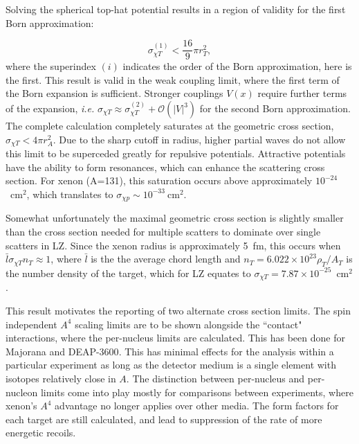 Solving the spherical top-hat potential results in a region of validity for the first Born approximation\cite{digman_not_2019}:

\begin{equation}
    \sigma_{\chi T}^{(1)} < \frac{16}{9} \pi r_T^2,
\end{equation}
\noindent
where the superindex $(i)$ indicates the order of the Born approximation, here is the first.
This result is valid in the weak coupling limit, where the first term of the Born expansion is sufficient.
Stronger couplings $V(x)$ require further terms of the expansion, \textit{i.e.}  $\sigma_{\chi T} \approx \sigma_{\chi T}^{(2)} + \mathcal{O}(|V|^3)$ for the second Born approximation.
The complete calculation completely saturates at the geometric cross section\cite{digman_not_2019}, $\sigma_{\chi T} < 4 \pi r_A^2$.
Due to the sharp cutoff in radius, higher partial waves do not allow this limit to be superceded greatly for repulsive potentials.
Attractive potentials have the ability to form resonances, which can enhance the scattering cross section.
For xenon (A=131), this saturation occurs above approximately $10^{-24}$~cm$^2$, which translates to  $\sigma_{\chi p}\sim 10^{-33}\mathrm{~cm}^2$.

Somewhat unfortunately the maximal geometric cross section is slightly smaller than the cross section needed for multiple scatters to dominate over single scatters in LZ.
Since the xenon radius is approximately 5~fm, this occurs when $\bar{l}\sigma_{\chi T}n_T \approx 1$, where $\bar l$ is the the average chord length and $n_T = 6.022 \times 10^{23} \rho_T / A_T$ is the number density of the target, which for LZ equates to $\sigma_{\chi T}=7.87\times 10^{-25}$~cm$^2$.

This result motivates the reporting of two alternate cross section limits.
The spin independent $A^4$ scaling limits are to be shown alongside the ``contact" interactions, where the per-nucleus limits are calculated.
This has been done for Majorana\cite{clark_direct_2020} and DEAP-3600\cite{lai_planck_2021}. 
This has minimal effects for the analysis within a particular experiment as long as the detector medium is a single element with isotopes relatively close in $A$.
The distinction between per-nucleus and per-nucleon limits come into play mostly for comparisons between experiments, where xenon's $A^4$ advantage no longer applies over other media.
The form factors for each target are still calculated, and lead to suppression of the rate of more energetic recoils.

